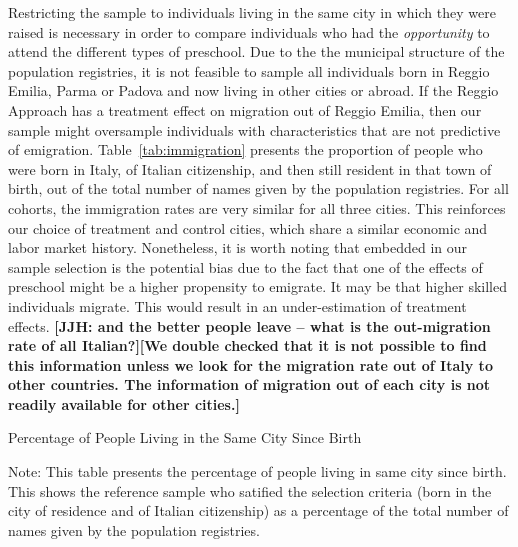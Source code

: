 Restricting the sample to individuals living in the same city in which they were raised is necessary in order to compare individuals who had the \textit{opportunity} to attend the different types of preschool. Due to the the municipal structure of the population registries, it is not feasible to sample all individuals born in Reggio Emilia, Parma or Padova and now living in other cities or abroad. If the Reggio Approach has a treatment effect on migration out of Reggio Emilia, then our sample might oversample individuals with characteristics that are not predictive of emigration. Table~\ref{tab:immigration} presents the proportion of people who were born in Italy, of Italian citizenship, and then still resident in that town of birth, out of the total number of names given by the population registries. For all cohorts, the immigration rates are very similar for all three cities. This reinforces our choice of treatment and control cities, which share a similar economic and labor market history. Nonetheless, it is worth noting that embedded in our sample selection is the potential bias due to the fact that one of the effects of preschool might be a higher propensity to emigrate. It may be that higher skilled individuals migrate. This would result in an under-estimation of treatment effects. \textbf{[JJH: and the better people leave -- what is the out-migration rate of all Italian?][We double checked that it is not possible to find this information unless we look for the migration rate out of Italy to other countries. The information of migration out of each city is not readily available for other cities.]}

\begin{table}[H]
\centering
\begin{threeparttable}
	\caption{Percentage of People Living in the Same City Since Birth}\label{tab:immigration}
	
\begin{tablenotes}
\footnotesize
Note: This table presents the percentage of people living in same city since birth. This  shows the reference sample who satified the selection criteria (born in the city of residence and of Italian citizenship) as a percentage of the total number of names given by the population registries.
\end{tablenotes}
\end{threeparttable}
\end{table}


